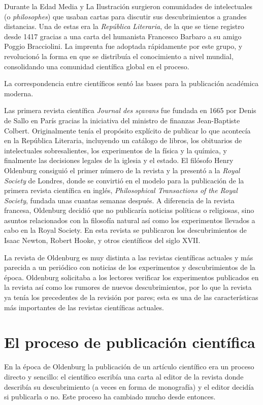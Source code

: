 Durante la Edad Media y La Ilustración surgieron comunidades de intelectuales (o
\emph{philosophes}) que usaban cartas para discutir sus descubrimientos a
grandes distancias.
Una de estas era la \emph{República Literaria}, de la que se tiene registro
desde 1417 gracias a una carta del humanista Francesco Barbaro a su amigo Poggio
Bracciolini.
La imprenta fue adoptada rápidamente por este grupo, y revolucionó la forma en
que se distribuía el conocimiento a nivel mundial, consolidando una comunidad
científica global en el proceso.

\begin{remember}
  La correspondencia entre científicos sentó las bases para la publicación
  académica moderna.
\end{remember}

Las primera revista científica \emph{Journal des sçavans} fue fundada en 1665
por Denis de Sallo en París gracias la iniciativa del ministro de finanzas
Jean-Baptiste Colbert.
Originalmente tenía el propósito explícito de publicar lo que acontecía en la
República Literaria, incluyendo un catálogo de libros, los obituarios de
intelectuales sobresalientes, los experimentos de la física y la química, y
finalmente las decisiones legales de la iglesia y el estado\cite{Fyfe2022-ca}.
El filósofo Henry Oldenburg consiguió el primer número de la revista y la
presentó a la \emph{Royal Society} de Londres, donde se convirtió en el modelo
para la publicación de la primera revista científica en inglés,
\emph{Philosophical Transactions of the Royal Society}, fundada unas cuantas
semanas después.
A diferencia de la revista francesa, Oldenburg decidió que no publicaría
noticias políticas o religiosas, sino asuntos relacionados con la filosofía
natural así como los experimentos llevados a cabo en la Royal Society.
En esta revista se publicaron los descubrimientos de Isaac Newton, Robert Hooke,
y otros científicos del siglo XVII.

La revista de Oldenburg es muy distinta a las revistas científicas actuales y
más parecida a un periódico con noticias de los experimentos y descubrimientos
de la época.
Oldenburg solicitaba a los lectores verificar los experimentos publicados en la
revista así como los rumores de nuevos descubrimientos, por lo que la revista
ya tenía los precedentes de la revisión por pares; esta es una de las
características más importantes de las revistas científicas actuales.

\section{El proceso de publicación científica}
\label{sec:procesopublicacion}
En la época de Oldenburg la publicación de un artículo científico era un proceso
directo y sencillo: el científico escribía una carta al editor de la revista
donde describía su descubrimiento (a veces en forma de monografía) y el editor
decidía si publicarla o no.
Este proceso ha cambiado mucho desde entonces.

